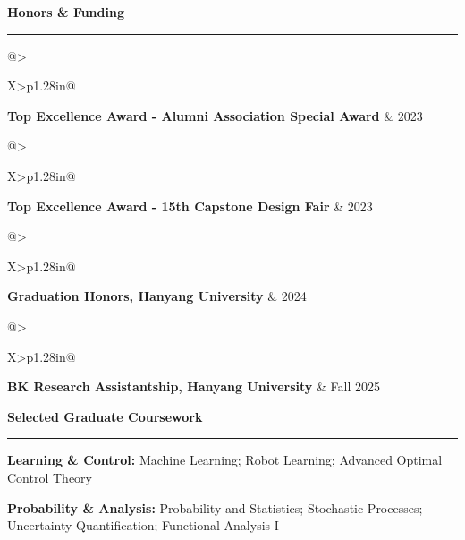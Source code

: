 \documentclass[10pt,letterpaper]{article}
\makeatletter
\newcommand{\cvsection}[1]{%
  \par\vspace{2.8pt}%
  {\color{navy}\bfseries\fontsize{11.7}{13.2}\selectfont #1}\par\vspace{0.8pt}
  {\color{rule}\rule{\linewidth}{0.45pt}}\par\vspace{1.5pt}
}
\newcommand{\headingrow}[2]{%
  \begin{tabularx}{\linewidth}{@{}>{\raggedright\arraybackslash}X>{\raggedleft\arraybackslash}p{1.28in}@{}}
    \textbf{#1} & \textcolor{muted}{#2}
  \end{tabularx}\par\vspace{-1.8pt}
}
\makeatother
\begin{document}
\cvsection{Honors \& Funding}
\headingrow{Top Excellence Award - Alumni Association Special Award}{2023}
\headingrow{Top Excellence Award - 15th Capstone Design Fair}{2023}
\headingrow{Graduation Honors, Hanyang University}{2024}
\headingrow{BK Research Assistantship, Hanyang University}{Fall 2025}

\cvsection{Selected Graduate Coursework}
\textbf{Learning \& Control:} Machine Learning; Robot Learning; Advanced Optimal Control Theory\par
\textbf{Probability \& Analysis:} Probability and Statistics; Stochastic Processes; Uncertainty Quantification; Functional Analysis I
\end{document}
